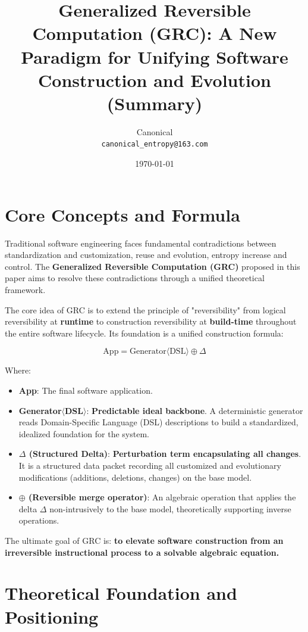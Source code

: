 \documentclass[11pt]{article}
\title{Generalized Reversible Computation (GRC): A New Paradigm for Unifying Software Construction and Evolution (Summary)}
\author{Canonical \\ \texttt{canonical\_entropy@163.com}}
\date{\today}
\begin{document}
\maketitle

\section{Core Concepts and Formula}

Traditional software engineering faces fundamental contradictions between standardization and customization, reuse and evolution, entropy increase and control. The \textbf{Generalized Reversible Computation (GRC)} proposed in this paper aims to resolve these contradictions through a unified theoretical framework.

The core idea of GRC is to extend the principle of "reversibility" from logical reversibility at \textbf{runtime} to construction reversibility at \textbf{build-time} throughout the entire software lifecycle. Its foundation is a unified construction formula:

\[
\text{App} = \text{Generator}\langle\text{DSL}\rangle \oplus \Delta
\]

Where:
\begin{itemize}
    \item \textbf{App}: The final software application.
    \item \textbf{Generator$\langle$DSL$\rangle$}: \textbf{Predictable ideal backbone}. A deterministic generator reads Domain-Specific Language (DSL) descriptions to build a standardized, idealized foundation for the system.
    \item \textbf{$\Delta$ (Structured Delta)}: \textbf{Perturbation term encapsulating all changes}. It is a structured data packet recording all customized and evolutionary modifications (additions, deletions, changes) on the base model.
    \item \textbf{$\oplus$ (Reversible merge operator)}: An algebraic operation that applies the delta $\Delta$ non-intrusively to the base model, theoretically supporting inverse operations.
\end{itemize}

The ultimate goal of GRC is: \textbf{to elevate software construction from an irreversible instructional process to a solvable algebraic equation.}

\section{Theoretical Foundation and Positioning}
\end{document}
